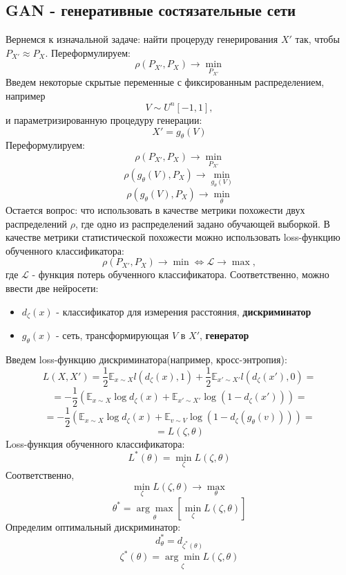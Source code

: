 \documentclass[a4paper]{article}
\begin{document}
		\subsection{GAN - генеративные состязательные сети}
				Вернемся к изначальной задаче: найти процеруду генерирования $X'$ так, чтобы $ P_{X'} \approx P_X$.
				Переформулируем:
				$$ \rho(P_{X'}, P_X) \longrightarrow \underset{P_{X'}}{\min} $$
				Введем некоторые скрытые переменные с фиксированным распределением, например
				$$ V \sim U^n [-1, 1], $$
				и параметризированную процедуру генерации:
				$$ X' = g_{\theta}(V) $$
				Переформулируем:
				$$ \rho(P_{X'}, P_X) \longrightarrow \underset{P_{X'}}{\min} $$
				$$ \rho(g_{\theta}(V), P_X) \longrightarrow \underset{g_{\theta}(V)}{\min} $$
				$$ \rho(g_{\theta}(V), P_X) \longrightarrow \underset{\theta}{\min} $$
				Остается вопрос: что использовать в качестве метрики похожести двух распределений $\rho$, где одно из распределений задано обучающей выборкой.
				В качестве метрики статистической похожести можно использовать loss-функцию обученного классификатора:
				$$ \rho(P_{X'}, P_X) \longrightarrow \min \Leftrightarrow \mathcal{L} \longrightarrow \max, $$
				где $\mathcal{L}$ - функция потерь обученного классификатора.
				Соответственно, можно ввести две нейросети:
					\begin{itemize}
						\item $d_{\zeta}(x)$ - классификатор для измерения расстояния, \textbf{дискриминатор}
						\item $g_{\theta}(x)$ - сеть, трансформирующая $V$ в $X'$, \textbf{генератор}
					\end{itemize}
					Введем loss-функцию дискриминатора(например, кросс-энтропия):
					$$ L(X, X') = \frac{1}{2} \mathbb{E}_{x \sim X} l(d_{\zeta}(x), 1) + \frac{1}{2} \mathbb{E}_{x' \sim X'} l(d_{\zeta}(x'), 0) = $$
					$$ = -\frac{1}{2} (\mathbb{E}_{x \sim X} \log d_{\zeta}(x) + \mathbb{E}_{x' \sim X'} \log (1 - d_{\zeta}(x'))) = $$
					$$ =  -\frac{1}{2} (\mathbb{E}_{x \sim X} \log d_{\zeta}(x) + \mathbb{E}_{v \sim V} \log (1 - d_{\zeta}(g_{\theta}(v)))) = $$
					$$ = L(\zeta, \theta) $$
					Loss-функция обученного классификатора:
					$$ L^*(\theta) = \underset{\zeta}{\min} L(\zeta, \theta) $$
					Соответственно,
					$$ \underset{\zeta}{\min} L(\zeta, \theta) \longrightarrow \underset{\theta}{\max} $$
					$$ \theta^* = \underset{\theta}{\arg\max} \left[ \underset{\zeta}{\min} L(\zeta, \theta) \right] $$
					Определим оптимальный дискриминатор:
					$$ d^*_{\theta} = d_{\zeta^*(\theta)} $$
					$$ \zeta^*(\theta) =  \underset{\zeta}{\arg\min} L(\zeta, \theta)$$
\end{document}
